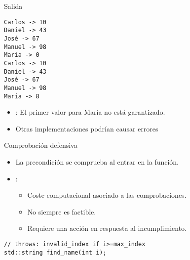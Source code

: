 

\begin{frame}[t,fragile]{Salida}
\begin{lstlisting}[style=terminal]
Carlos -> 10
Daniel -> 43
José -> 67
Manuel -> 98
Maria -> 0
Carlos -> 10
Daniel -> 43
José -> 67
Manuel -> 98
Maria -> 8
\end{lstlisting}
\begin{itemize}
  \item {}: El primer valor para María no está garantizado.
  \item Otras implementaciones podrían causar errores
\end{itemize}
\end{frame}


\begin{frame}[t,fragile]{Comprobación defensiva}
\begin{itemize}
  \item La precondición se comprueba al entrar en la función.

  \item {}:
    \begin{itemize}
      \item Coste computacional asociado a las comprobaciones.
      \item No siempre es factible.
      \item Requiere una acción en respuesta al incumplimiento.
    \end{itemize}
\end{itemize}

\begin{lstlisting}
// throws: invalid_index if i>=max_index
std::string find_name(int i);
\end{lstlisting}
\end{frame}

